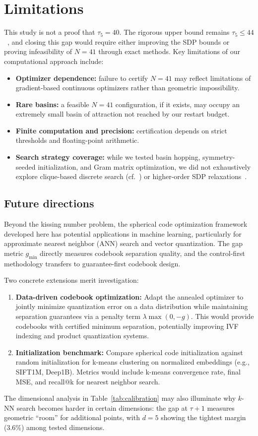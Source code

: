 \documentclass[11pt]{article}
\begin{document}
\section{Limitations}
This study is not a proof that $\tau_5=40$. The rigorous upper bound remains $\tau_5 \le 44$~\cite{MittelmannVallentin2010}, and closing this gap would require either improving the SDP bounds or proving infeasibility of $N=41$ through exact methods. Key limitations of our computational approach include:
\begin{itemize}
\item \textbf{Optimizer dependence:} failure to certify $N=41$ may reflect limitations of gradient-based continuous optimizers rather than geometric impossibility.
\item \textbf{Rare basins:} a feasible $N=41$ configuration, if it exists, may occupy an extremely small basin of attraction not reached by our restart budget.
\item \textbf{Finite computation and precision:} certification depends on strict thresholds and floating-point arithmetic.
\item \textbf{Search strategy coverage:} while we tested basin hopping, symmetry-seeded initialization, and Gram matrix optimization, we did not exhaustively explore clique-based discrete search (cf.~\cite{Szollosi2023}) or higher-order SDP relaxations~\cite{BachocVallentin2008}.
\end{itemize}

\subsection{Future directions}
Beyond the kissing number problem, the spherical code optimization framework developed here has potential applications in machine learning, particularly for approximate nearest neighbor (ANN) search and vector quantization. The gap metric $g_{\min}$ directly measures codebook separation quality, and the control-first methodology transfers to guarantee-first codebook design.

Two concrete extensions merit investigation:
\begin{enumerate}
\item \textbf{Data-driven codebook optimization:} Adapt the annealed optimizer to jointly minimize quantization error on a data distribution while maintaining separation guarantees via a penalty term $\lambda \max(0, -g)$. This would provide codebooks with certified minimum separation, potentially improving IVF indexing and product quantization systems.
\item \textbf{Initialization benchmark:} Compare spherical code initialization against random initialization for k-means clustering on normalized embeddings (e.g., SIFT1M, Deep1B). Metrics would include k-means convergence rate, final MSE, and recall@k for nearest neighbor search.
\end{enumerate}
The dimensional analysis in Table~\ref{tab:calibration} may also illuminate why $k$-NN search becomes harder in certain dimensions: the gap at $\tau+1$ measures geometric ``room'' for additional points, with $d=5$ showing the tightest margin (3.6\%) among tested dimensions.
\end{document}
